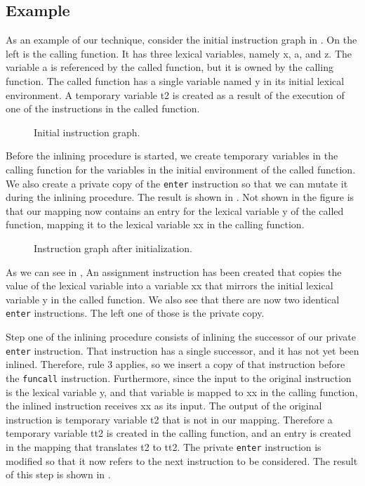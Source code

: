 \subsection{Example}

As an example of our technique, consider the initial instruction graph
in .  On the left is the calling function.  It has three
lexical variables, namely x, a, and z.  The variable a is referenced by
the called function, but it is owned by the calling function.  The
called function has a single variable named y in its initial lexical
environment.  A temporary variable t2 is created as a result of the
execution of one of the instructions in the called function.

\begin{figure}
\begin{center}
\end{center}
\caption{\label{fig31}
Initial instruction graph.}
\end{figure}

Before the inlining procedure is started, we create temporary
variables in the calling function for the variables in the initial
environment of the called function.  We also create a private copy of
the \texttt{enter} instruction so that we can mutate it during the
inlining procedure.  The result is shown in .  Not shown
in the figure is that our mapping now contains an entry for the
lexical variable y of the called function, mapping it to the lexical
variable xx in the calling function.

\begin{figure}
\begin{center}
\end{center}
\caption{\label{fig32}
Instruction graph after initialization.}
\end{figure}

As we can see in , An assignment instruction has been
created that copies the value of the lexical variable into a variable
xx that mirrors the initial lexical variable y in the called
function.  We also see that there are now two identical \texttt{enter}
instructions.  The left one of those is the private copy.

Step one of the inlining procedure consists of inlining the successor
of our private \texttt{enter} instruction.  That instruction has a
single successor, and it has not yet been inlined.  Therefore, rule 3
applies, so we insert a copy of that instruction before the
\texttt{funcall} instruction.  Furthermore, since the input to the
original instruction is the lexical variable y, and that variable is
mapped to xx in the calling function, the inlined instruction receives
xx as its input.  The output of the original instruction is temporary
variable t2 that is not in our mapping.  Therefore a temporary variable
tt2 is created in the calling function, and an entry is created in the
mapping that translates t2 to tt2.  The private \texttt{enter}
instruction is modified so that it now refers to the next instruction
to be considered.  The result of this step is shown in .

